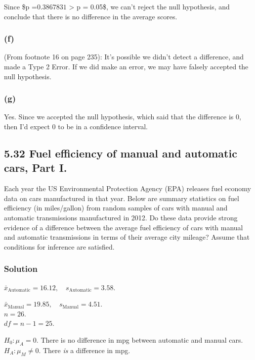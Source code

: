 \documentclass[]{article}
\begin{document}
Since \$p =\(0.3867831\) \textgreater{} p = 0.05\$, we can't reject the
null hypothesis, and conclude that there is no difference in the average
scores.

\subsubsection{(f)}\label{f}

(From footnote 16 on page 235): It's possible we didn't detect a
difference, and made a Type 2 Error. If we did make an error, we may
have falsely accepted the null hypothesis.

\subsubsection{(g)}\label{g}

Yes. Since we accepted the null hypothesis, which said that the
difference is 0, then I'd expect 0 to be in a confidence interval.

\subsection{5.32 Fuel efficiency of manual and automatic cars, Part
I.}\label{fuel-efficiency-of-manual-and-automatic-cars-part-i.}

Each year the US Environmental Protection Agency (EPA) releases fuel
economy data on cars manufactured in that year. Below are summary
statistics on fuel efficiency (in miles/gallon) from random samples of
cars with manual and automatic transmissions manufactured in 2012. Do
these data provide strong evidence of a difference between the average
fuel efficiency of cars with manual and automatic transmissions in terms
of their average city mileage? Assume that conditions for inference are
satisfied.

\subsubsection{Solution}\label{solution-1}

\(\bar{x}_{\text{Automatic}} = 16.12, \quad s_{\text{Automatic}} = 3.58\).

\(\bar{x}_{\text{Manual}} = 19.85, \quad s_{\text{Manual}} = 4.51\).\\
\(n = 26\).\\
\(df = n - 1 = 25\).

\(H_0: \mu_{A} = 0.\) There is no difference in mpg between automatic
and manual cars.\\
\(H_A: \mu_{M} \neq 0\). There \emph{is} a difference in mpg.
\end{document}
